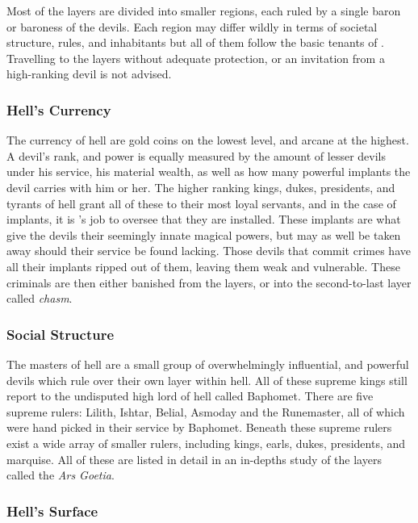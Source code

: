 Most of the layers are divided into smaller regions, each ruled by a single
baron or baroness of the devils. Each region may differ wildly in terms of
societal structure, rules, and inhabitants but all of them follow the basic
tenants of . Travelling to the layers without adequate
protection, or an invitation from a high-ranking devil is not advised.

\subsubsection{Hell's Currency}

The currency of hell are gold coins on the lowest level, and arcane
 at the highest. A devil's rank, and power is equally
measured by the amount of lesser devils under his service, his material
wealth, as well as how many powerful implants the devil carries with him
or her. The higher ranking kings, dukes, presidents, and tyrants of hell
grant all of these to their most loyal servants, and in the case of implants,
it is 's job to oversee that they are installed. These
implants are what give the devils their seemingly innate magical powers,
but may as well be taken away should their service be found lacking. Those
devils that commit crimes have all their implants ripped out of them, leaving
them weak and vulnerable. These criminals are then either banished from the
layers, or into the second-to-last layer called \emph{chasm}.

\subsubsection{Social Structure}

The masters of hell are a small group of overwhelmingly influential, and
powerful devils which rule over their own layer within hell. All of these
supreme kings still report to the undisputed high lord of hell called
Baphomet. There are five supreme rulers: Lilith, Ishtar, Belial, Asmoday and
the Runemaster, all of which were hand picked in their service by Baphomet.
Beneath these supreme rulers exist a wide array of smaller rulers, including
kings, earls, dukes, presidents, and marquise. All of these are listed in
detail in an in-depths study of the layers called the \emph{Ars Goetia}.

\subsubsection{Hell's Surface}
\label{sec:Hells Surface}

